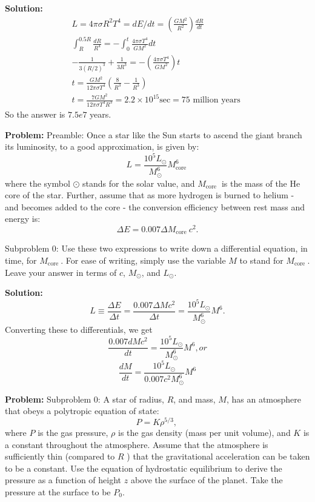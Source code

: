 \documentclass[10pt]{article}
\begin{document}
\textbf{Solution:}
\[
\begin{gathered}
L=4 \pi \sigma R^{2} T^{4}=d E / d t=\left(\frac{G M^{2}}{R^{2}}\right) \frac{d R}{d t} \\
\int_{R}^{0.5 R} \frac{d R}{R^{4}}=-\int_{0}^{t} \frac{4 \pi \sigma T^{4}}{G M^{2}} d t \\
-\frac{1}{3(R / 2)^{3}}+\frac{1}{3 R^{3}}=-\left(\frac{4 \pi \sigma T^{4}}{G M^{2}}\right) t \\
t=\frac{G M^{2}}{12 \pi \sigma T^{4}}\left(\frac{8}{R^{3}}-\frac{1}{R^{3}}\right) \\
t=\frac{7 G M^{2}}{12 \pi \sigma T^{4} R^{3}}=2.2 \times 10^{15} \mathrm{sec}=75 \text { million years }
\end{gathered}
\]
So the answer is $\boxed{7.5e7}$ years.


\textbf{Problem:}
Preamble: Once a star like the Sun starts to ascend the giant branch its luminosity, to a good approximation, is given by:
\[
L=\frac{10^{5} L_{\odot}}{M_{\odot}^{6}} M_{\text {core }}^{6}
\]
where the symbol $\odot$ stands for the solar value, and $M_{\text {core }}$ is the mass of the He core of the star. Further, assume that as more hydrogen is burned to helium - and becomes added to the core - the conversion efficiency between rest mass and energy is:
\[
\Delta E=0.007 \Delta M_{\text {core }} c^{2} .
\]

Subproblem 0: Use these two expressions to write down a differential equation, in time, for $M_{\text {core }}$.  For ease of writing, simply use the variable $M$ to stand for $M_{\text {core }}$.  Leave your answer in terms of $c$, $M_{\odot}$, and $L_{\odot}$.


\textbf{Solution:}
\[
L \equiv \frac{\Delta E}{\Delta t}=\frac{0.007 \Delta M c^{2}}{\Delta t}=\frac{10^{5} L_{\odot}}{M_{\odot}^{6}} M^{6}.
\]
Converting these to differentials, we get
\begin{equation}
\frac{0.007 dM c^{2}}{dt}=\frac{10^{5} L_{\odot}}{M_{\odot}^{6}} M^{6}, or
\end{equation}
\begin{equation}
\boxed{\frac{dM}{dt}=\frac{10^{5} L_{\odot}}{0.007 c^{2} M_{\odot}^{6}} M^{6}}
\end{equation}


\textbf{Problem:}
Subproblem 0: A star of radius, $R$, and mass, $M$, has an atmosphere that obeys a polytropic equation of state:
\[
P=K \rho^{5 / 3} \text {, }
\]
where $P$ is the gas pressure, $\rho$ is the gas density (mass per unit volume), and $K$ is a constant throughout the atmosphere. Assume that the atmosphere is sufficiently thin (compared to $R$ ) that the gravitational acceleration can be taken to be a constant.
Use the equation of hydrostatic equilibrium to derive the pressure as a function of height $z$ above the surface of the planet. Take the pressure at the surface to be $P_{0}$.
\end{document}
